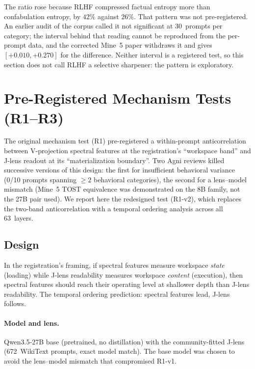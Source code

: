 \documentclass[11pt,a4paper]{article}
\begin{document}
The ratio rose because RLHF compressed factual entropy more than
confabulation entropy, by $42\%$ against $26\%$. That pattern was not
pre-registered. An earlier audit of the corpus called it not
significant at 30~prompts per category; the interval behind that
reading cannot be reproduced from the per-prompt data, and the
corrected Mine~5 paper withdraws it and gives $[+0.010, +0.270]$ for
the difference. Neither interval is a registered test, so this section
does not call RLHF a selective sharpener: the pattern is exploratory.

\section{Pre-Registered Mechanism Tests (R1--R3)}
\label{sec:mechanism}

The original mechanism test (R1) pre-registered a within-prompt
anticorrelation between V-projection spectral features at the registration's ``workspace band'' and J-lens
readout at its ``materialization boundary''. Two Agni
reviews killed successive versions of this design: the first for
insufficient behavioral variance (0/10 prompts spanning ${\geq}2$
behavioral categories), the second for a lens--model mismatch (Mine~5
TOST equivalence was demonstrated on the 8B family, not the 27B pair
used). We report here the redesigned test (R1-v2), which replaces the
two-band anticorrelation with a temporal ordering analysis across all
63~layers.

\subsection{Design}

In the registration's framing, if spectral features measure workspace
\emph{state} (loading) while J-lens readability measures workspace
\emph{content} (execution), then spectral features should reach their operating level
at shallower depth than J-lens readability. The temporal ordering
prediction: spectral features lead, J-lens follows.

\paragraph{Model and lens.} Qwen3.5-27B base (pretrained, no
distillation) with the community-fitted J-lens (672~WikiText prompts,
exact model match). The base model was chosen to avoid the lens--model
mismatch that compromised R1-v1.
\end{document}
